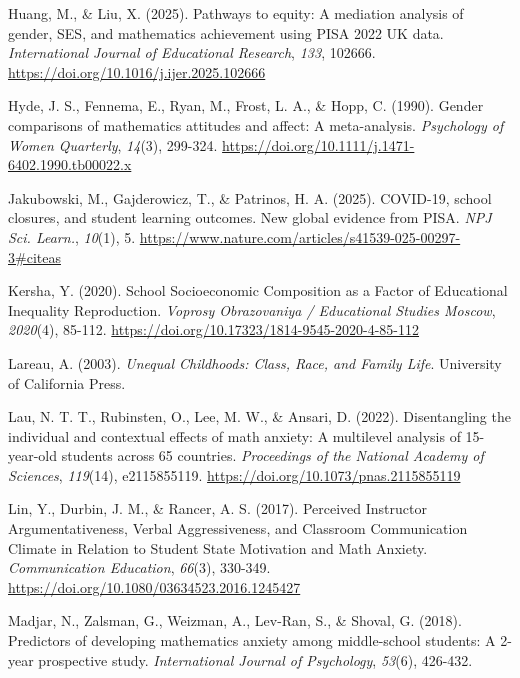 \documentclass[
  spanish,
  a4paper,
  oneside]{scrbook}
\newlength{\cslhangindent}
\newenvironment{CSLReferences}[2] %
 {\begin{list}{}{%
  \setlength{\itemindent}{0pt}
  \setlength{\leftmargin}{0pt}
  \setlength{\parsep}{0pt}
  \ifodd #1
   \setlength{\leftmargin}{\cslhangindent}
   \setlength{\itemindent}{-1\cslhangindent}
  \fi
  \setlength{\itemsep}{#2\baselineskip}}}
 {\end{list}}
\begin{document}
\begin{CSLReferences}{1}{0}
Huang, M., \& Liu, X. (2025). Pathways to equity: A mediation analysis
of gender, SES, and mathematics achievement using PISA 2022 UK data.
\emph{International Journal of Educational Research}, \emph{133},
102666. \url{https://doi.org/10.1016/j.ijer.2025.102666}

Hyde, J. S., Fennema, E., Ryan, M., Frost, L. A., \& Hopp, C. (1990).
Gender comparisons of mathematics attitudes and affect: A meta-analysis.
\emph{Psychology of Women Quarterly}, \emph{14}(3), 299-324.
\url{https://doi.org/10.1111/j.1471-6402.1990.tb00022.x}

Jakubowski, M., Gajderowicz, T., \& Patrinos, H. A. (2025). {COVID-19},
school closures, and student learning outcomes. New global evidence from
{PISA}. \emph{NPJ Sci. Learn.}, \emph{10}(1), 5.
\url{https://www.nature.com/articles/s41539-025-00297-3\#citeas}

Kersha, Y. (2020). School Socioeconomic Composition as a Factor of
Educational Inequality Reproduction. \emph{Voprosy Obrazovaniya /
Educational Studies Moscow}, \emph{2020}(4), 85-112.
\url{https://doi.org/10.17323/1814-9545-2020-4-85-112}

Lareau, A. (2003). \emph{Unequal Childhoods: Class, Race, and Family
Life}. University of California Press.

Lau, N. T. T., Rubinsten, O., Lee, M. W., \& Ansari, D. (2022).
Disentangling the individual and contextual effects of math anxiety: A
multilevel analysis of 15-year-old students across 65 countries.
\emph{Proceedings of the National Academy of Sciences}, \emph{119}(14),
e2115855119. \url{https://doi.org/10.1073/pnas.2115855119}

Lin, Y., Durbin, J. M., \& Rancer, A. S. (2017). Perceived Instructor
Argumentativeness, Verbal Aggressiveness, and Classroom Communication
Climate in Relation to Student State Motivation and Math Anxiety.
\emph{Communication Education}, \emph{66}(3), 330-349.
\url{https://doi.org/10.1080/03634523.2016.1245427}

Madjar, N., Zalsman, G., Weizman, A., Lev-Ran, S., \& Shoval, G. (2018).
Predictors of developing mathematics anxiety among middle-school
students: A 2-year prospective study. \emph{International Journal of
Psychology}, \emph{53}(6), 426-432.


\end{CSLReferences}
\end{document}
